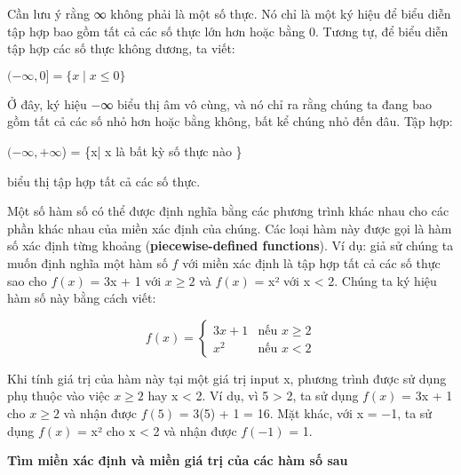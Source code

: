 \documentclass[a4paper,12pt,openany]{book}
\begin{document}
\clearpage
\pagestyle{fancy} %
\fancyhf{} %
\fancyhead[L]{} %

Cần lưu ý rằng ∞ không phải là một số thực. Nó chỉ là một ký hiệu để biểu diễn tập hợp bao gồm tất cả các số thực lớn hơn hoặc bằng 0. Tương tự, để biểu diễn tập hợp các số thực không dương, ta viết:
\begin{center}
 \((-\infty,0] = \{x \mid x \leq 0\}\)
\end{center}

Ở đây, ký hiệu −∞ biểu thị âm vô cùng, và nó chỉ ra rằng chúng ta đang bao gồm tất cả các số nhỏ hơn hoặc bằng không, bất kể chúng nhỏ đến đâu. Tập hợp: 
\begin{center}
 \((-\infty,+\infty\)) = \{x| x là bất kỳ số thực nào \}
\end{center}
biểu thị tập hợp tất cả các số thực.

\par
\vspace{10pt}
Một số hàm số có thể được định nghĩa bằng các phương trình khác nhau cho các phần khác nhau của miền xác định của chúng. Các loại hàm này được gọi là hàm số xác định từng khoảng (\textbf{piecewise-defined functions}). Ví dụ: giả sử chúng ta muốn định nghĩa một hàm số $f$ với miền xác định là tập hợp tất cả các số thực sao cho $f(x)$ = 3x + 1 với \( x \geq 2 \) và $f(x)$ = x² với x < 2. Chúng ta ký hiệu hàm số này bằng cách viết:

\[ 
f(x) = 
\begin{cases} 
3x + 1 & \text{nếu } x \geq 2 \\ 
x^2 & \text{nếu } x < 2 
\end{cases} 
\]
\vspace{10pt}

Khi tính giá trị của hàm này tại một giá trị input x, phương trình được sử dụng phụ thuộc vào việc \( x \geq 2 \) hay x < 2. Ví dụ, vì 5 > 2, ta sử dụng $f(x)$ = 3x + 1 cho \( x \geq 2 \) và nhận được $f(5)$ = 3(5) + 1 = 16. Mặt khác, với x = −1, ta sử dụng $f(x)$ = x² cho x < 2 và nhận được $f(−1)$ = 1.

\vspace{10pt}
\begin{tcolorbox}
    [
    colframe=blue!10,      %
    colback=blue!10,    %
    ]
\textbf{Tìm miền xác định và miền giá trị của các hàm số sau}    
\end{tcolorbox}
\end{document}
